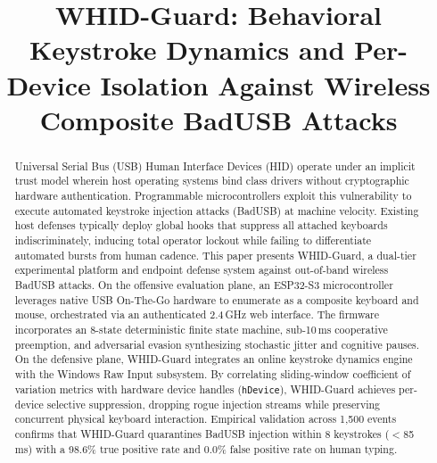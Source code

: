 \documentclass[conference]{IEEEtran}
\begin{document}
\title{WHID-Guard: Behavioral Keystroke Dynamics and Per-Device Isolation Against Wireless Composite BadUSB Attacks}

\author{
\and
{}
}

\maketitle

\begin{abstract}
Universal Serial Bus (USB) Human Interface Devices (HID) operate under an implicit trust model wherein host operating systems bind class drivers without cryptographic hardware authentication. Programmable microcontrollers exploit this vulnerability to execute automated keystroke injection attacks (BadUSB) at machine velocity. Existing host defenses typically deploy global hooks that suppress all attached keyboards indiscriminately, inducing total operator lockout while failing to differentiate automated bursts from human cadence. This paper presents WHID-Guard, a dual-tier experimental platform and endpoint defense system against out-of-band wireless BadUSB attacks. On the offensive evaluation plane, an ESP32-S3 microcontroller leverages native USB On-The-Go hardware to enumerate as a composite keyboard and mouse, orchestrated via an authenticated 2.4\,GHz web interface. The firmware incorporates an 8-state deterministic finite state machine, sub-10\,ms cooperative preemption, and adversarial evasion synthesizing stochastic jitter and cognitive pauses. On the defensive plane, WHID-Guard integrates an online keystroke dynamics engine with the Windows Raw Input subsystem. By correlating sliding-window coefficient of variation metrics with hardware device handles (\texttt{hDevice}), WHID-Guard achieves per-device selective suppression, dropping rogue injection streams while preserving concurrent physical keyboard interaction. Empirical validation across 1,500 events confirms that WHID-Guard quarantines BadUSB injection within 8 keystrokes ($<$85\,ms) with a 98.6\% true positive rate and 0.0\% false positive rate on human typing.
\end{abstract}
\end{document}
